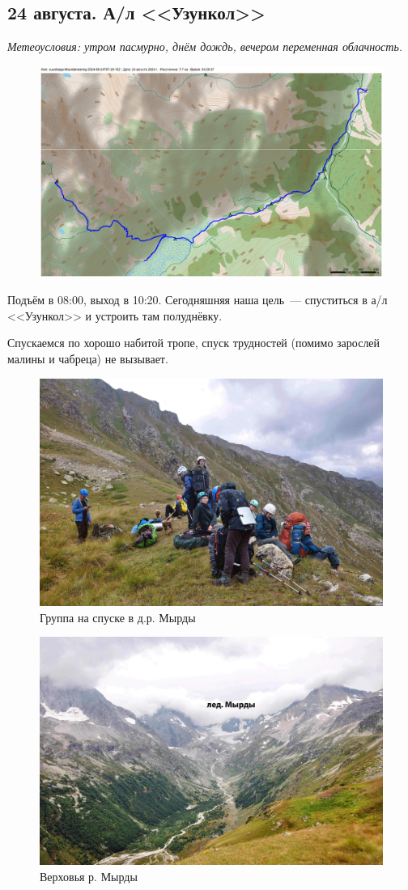 \subsection{24 августа. А/л <<Узункол>>}
\textit{Метеоусловия: утром пасмурно, днём дождь, вечером переменная облачность.}


\begin{figure}[h!]
	\centering
	\includegraphics[angle=0, width=0.7\linewidth]{../pics/mini_maps/24}
	\label{fig:mini_24}
\end{figure}



Подъём в 08:00, выход в 10:20. Сегодняшняя наша цель~--- спуститься в а/л <<Узункол>> и устроить там полуднёвку.

Спускаемся по хорошо  набитой тропе, спуск трудностей (помимо зарослей малины и чабреца) не вызывает.

\begin{figure}[h!]
	\centering
	\includegraphics[width=0.7\linewidth]{../pics/DSC_0104.jpg}
	\caption{Группа на спуске в д.р. Мырды}
	\label{fig:DSC_0104.jpg}
\end{figure}

\begin{figure}[h!]
	\centering
	\includegraphics[width=0.7\linewidth]{../pics/DSC_0107.jpg}
	\caption{Верховья р. Мырды}
	\label{fig:DSC_0107.jpg}
\end{figure}


